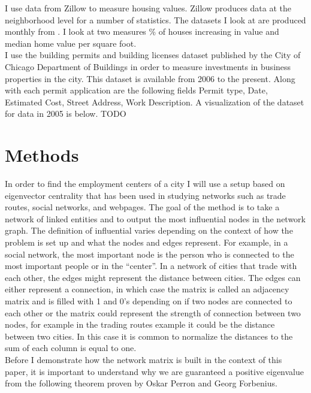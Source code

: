 \documentclass{article}
\theoremstyle{definition}
\theoremstyle{remark}
\begin{document}
I use data from Zillow to measure housing values.  Zillow produces data at the neighborhood level for a number of statistics.  The datasets I look at are produced monthly from .  I look at two measures \% of houses increasing in value and median home value per square foot.\\

I use the building permits and building licenses dataset published by the City of Chicago Department of Buildings in order to measure investments in business properties in the city.  This dataset is available from 2006 to the present.  Along with each permit application are the following fields Permit type, Date, Estimated Cost, Street Address, Work Description.  A visualization of the dataset for data in 2005 is below. TODO


\section{Methods}
In order to find the employment centers of a city I will use a setup based on eigenvector centrality that has been used in studying networks such as trade routes, social networks, and webpages.  The goal of the method is to take a network of linked entities and to output the most influential nodes in the network graph.  The definition of influential varies depending on the context of how the problem is set up and what the nodes and edges represent.  For example, in a social network, the most important node is the person who is connected to the most important people or in the “center”.  In a network of cities that trade with each other, the edges might represent the distance between cities.  The edges can either represent a connection, in which case the matrix is called an adjacency matrix and is filled with 1 and 0’s depending on if two nodes are connected to each other or the matrix could represent the strength of connection between two nodes, for example in the trading routes example it could be the distance between two cities.  In this case it is common to normalize the distances to the sum of each column is equal to one. \\

Before I demonstrate how the network matrix is built in the context of this paper, it is important to understand why we are guaranteed a positive eigenvalue from the following theorem proven by Oskar Perron and Georg Forbenius.
\end{document}
